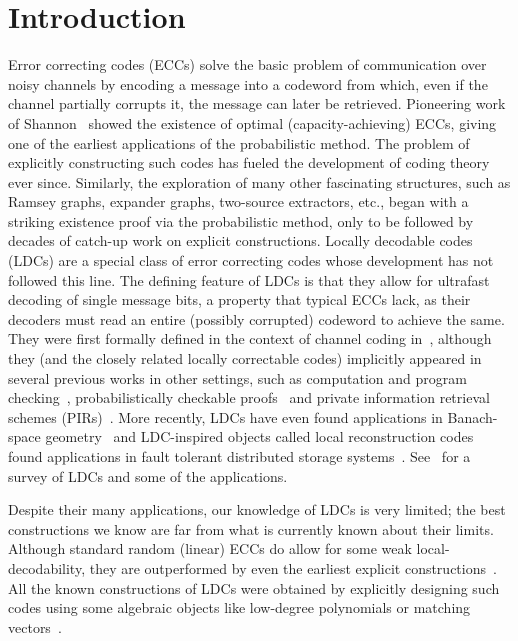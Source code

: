 \documentclass{toc}
\begin{document}
%
%
%

\section{Introduction}

Error correcting codes (ECCs) solve the basic problem of communication over noisy channels by encoding a message into a codeword from which, even if the channel partially corrupts it, the message can later be retrieved.
Pioneering work of Shannon~\cite{Shannon:1948} showed the existence of optimal (capacity-achieving) ECCs, giving one of the earliest applications of the probabilistic method. %
The problem of explicitly constructing such codes has fueled the development of coding theory ever since.
Similarly, the exploration of many other fascinating structures, such as Ramsey graphs, expander graphs, 
two-source extractors, %
etc., began with a striking existence proof  via the probabilistic method, only to be followed by decades of catch-up work on explicit constructions.
Locally decodable codes (LDCs) are a special class of error correcting codes whose development has not followed this line.
The defining feature of LDCs is that they allow for ultrafast %
decoding of single message bits, a property that typical ECCs lack, as their decoders must read an entire (possibly corrupted) codeword to achieve the same.
They were first formally defined in the context of channel coding in~\cite{Katz:2000}, although they (and the closely related locally correctable codes) implicitly appeared in several previous works in other settings, such as computation and program checking~\cite{bfls, BK95}, probabilistically checkable proofs~\cite{AS98,ALMSS98} and private information retrieval schemes (PIRs)~\cite{CKGS98}. More recently, LDCs have even found applications in Banach-space geometry~\cite{Briet:2012d} and LDC-inspired objects called local reconstruction codes found applications in fault tolerant distributed storage systems~\cite{GHSY12}. See~\cite{Yekhanin:2012} for a survey of LDCs and some of the applications.

Despite their many applications, our knowledge of LDCs is very limited; the best constructions we know are far from what is currently known about their limits.
Although standard random (linear) ECCs do allow for some weak local-decodability, they are outperformed by even the earliest explicit constructions~\cite{KS07}.
All the known constructions of LDCs were obtained by explicitly designing such codes using some algebraic objects like low-degree polynomials or matching vectors~\cite{Yekhanin:2012}. 
\end{document}
